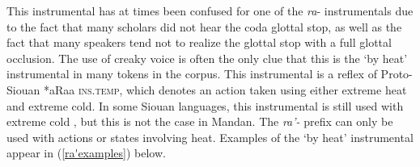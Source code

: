 \label{ParaByHeat}

This instrumental has at times been confused for one of the \textit{ra}- instrumentals due to the fact that many scholars did not hear the coda glottal stop, as well as the fact that many speakers tend not to realize the glottal stop with a full glottal occlusion. The use of creaky voice is often the only clue that this is the `by heat' instrumental in many tokens in the corpus. This instrumental is a reflex of Proto-Siouan *aRaa \textsc{ins.temp}, which denotes an action taken using either extreme heat and extreme cold. In some Siouan languages, this instrumental is still used with extreme cold \citep{rankin2015}, but this is not the case in Mandan. The \textit{ra'-} prefix can only be used with actions or states involving heat. Examples of the `by heat' instrumental appear in (\ref{ra'examples}) below.

